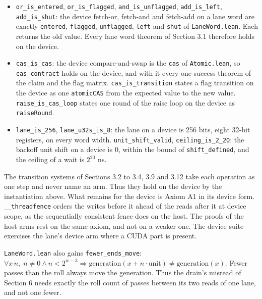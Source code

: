 \begin{itemize}
\item \texttt{or\_\allowbreak{}is\_\allowbreak{}entered}, \texttt{or\_\allowbreak{}is\_\allowbreak{}flagged}, \texttt{and\_\allowbreak{}is\_\allowbreak{}unflagged}, \texttt{add\_\allowbreak{}is\_\allowbreak{}left}, \texttt{add\_\allowbreak{}is\_\allowbreak{}shut}: the device fetch-or, fetch-and and fetch-add on a lane word are exactly \texttt{entered}, \texttt{flagged}, \texttt{unflagged}, \texttt{left} and \texttt{shut} of \texttt{Lane\allowbreak{}Word.\allowbreak{}lean}. Each returns the old value. Every lane word theorem of Section 3.1 therefore holds on the device.
\item \texttt{cas\_\allowbreak{}is\_\allowbreak{}cas}: the device compare-and-swap is the \texttt{cas} of \texttt{Atomic.\allowbreak{}lean}, so \texttt{cas\_\allowbreak{}contract} holds on the device, and with it every one-success theorem of the claim and the flag matrix. \texttt{cas\_\allowbreak{}is\_\allowbreak{}transition} states a flag transition on the device as one \texttt{atomic\allowbreak{}CAS} from the expected value to the new value. \texttt{raise\_\allowbreak{}is\_\allowbreak{}cas\_\allowbreak{}loop} states one round of the raise loop on the device as \texttt{raise\allowbreak{}Round}.
\item \texttt{lane\_\allowbreak{}is\_\allowbreak{}256}, \texttt{lane\_\allowbreak{}u32s\_\allowbreak{}is\_\allowbreak{}8}: the lane on a device is 256 bits, eight 32-bit registers, on every word width. \texttt{unit\_\allowbreak{}shift\_\allowbreak{}valid}, \texttt{ceiling\_\allowbreak{}is\_\allowbreak{}2\_\allowbreak{}20}: the backoff unit shift on a device is 0, within the bound of \texttt{shift\_\allowbreak{}defined}, and the ceiling of a wait is \(2^{20}\) ns.
\end{itemize}

The transition systems of Sections 3.2 to 3.4, 3.9 and 3.12 take each operation as one step and never name an arm. Thus they hold on the device by the instantiation above. What remains for the device is Axiom A1 in its device form. \texttt{\_\allowbreak{}\_\allowbreak{}threadfence} orders the writes before it ahead of the reads after it at device scope, as the sequentially consistent fence does on the host. The proofs of the host arms rest on the same axiom, and not on a weaker one. The device suite exercises the lane's device arm where a CUDA part is present.

\texttt{Lane\allowbreak{}Word.\allowbreak{}lean} also gains \texttt{fewer\_\allowbreak{}ends\_\allowbreak{}move}: \(\forall x\, n,\; n \neq 0 \land n < 2^{w-3} \Rightarrow \mathrm{generation}(x + n \cdot \mathrm{unit}) \neq \mathrm{generation}(x)\). Fewer passes than the roll always move the generation. Thus the drain's misread of Section 6 needs exactly the roll count of passes between its two reads of one lane, and not one fewer.


